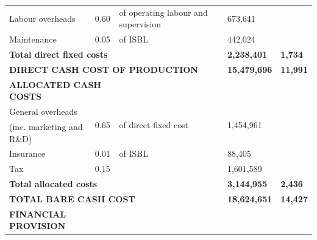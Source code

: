 \begin{table}[H]
\begin{tabular}{@{}llllll@{}}
Labour overheads              & 0.60                  & of operating labour and supervision   &                           & 673,641                    &                      \\
Maintenance                   & 0.05                  & of ISBL                               &                           & 442,024                    &                      \\ \cline{5-6} 
\multicolumn{3}{l}{\textbf{Total direct fixed costs}}                                         &                           & \textbf{2,238,401}         & \textbf{1,734}       \\ \cline{5-6} 
\multicolumn{3}{l}{\textbf{DIRECT CASH COST OF PRODUCTION}}                                   &                           & \textbf{15,479,696}        & \textbf{11,991}      \\
\multicolumn{2}{l}{\textbf{ALLOCATED CASH COSTS}}     &                                       &                           & \textbf{}                  &                      \\ \cline{1-2}
General overheads             & \multirow{2}{*}{0.65} & \multirow{2}{*}{of direct fixed cost} &                           & \multirow{2}{*}{1,454,961} &                      \\
(inc. marketing and R\&D)     &                       &                                       &                           &                            &                      \\
Insurance                     & 0.01                  & of ISBL                               &                           & 88,405                     &                      \\
Tax                           & 0.15                  &                                       &                           & 1,601,589                  &                      \\ \cline{5-6} 
\multicolumn{4}{l}{\textbf{Total allocated costs}}                                                                        & \textbf{3,144,955}         & \textbf{2,436}       \\ \cline{5-6} 
\multicolumn{4}{l}{\textbf{TOTAL BARE CASH COST}}                                                                         & \textbf{18,624,651}        & \textbf{14,427}      \\
\multicolumn{2}{l}{\textbf{FINANCIAL PROVISION}}      &                                       &                           & \textbf{}                  &                      \\ \cline{1-2}

\end{tabular}
\end{table}
